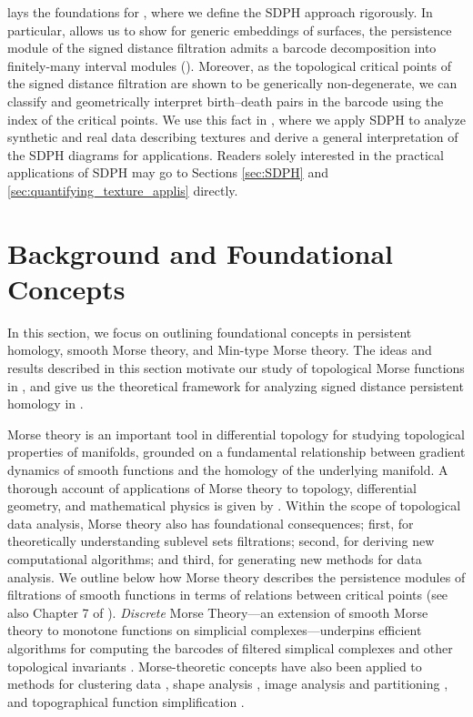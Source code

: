 \documentclass[11pt]{article}
\theoremstyle{plain}
\theoremstyle{definition}
\theoremstyle{remark}
\begin{document}
 lays the foundations for , where we define the SDPH approach rigorously. In particular,  allows us to show for generic embeddings of surfaces, the persistence module of the signed distance filtration admits a barcode decomposition into finitely-many interval modules (). Moreover, as the topological critical points of the signed distance filtration are shown to be generically non-degenerate, we can classify and geometrically interpret birth--death pairs in the barcode using the index of the critical points. We use this fact in , where we apply SDPH to analyze synthetic and real data describing textures and derive a general interpretation of the SDPH diagrams for applications.
Readers solely interested in the practical applications of SDPH may go to Sections \ref{sec:SDPH} and \ref{sec:quantifying_texture_applis} directly.


\section{Background and Foundational Concepts}
\label{sec:background}

In this section, we focus on outlining foundational concepts in persistent homology, smooth Morse theory, and Min-type Morse theory. The ideas and results described in this section motivate our study of topological Morse functions in , and give us the theoretical framework for analyzing signed distance persistent homology in . 

Morse theory \citep{milnor_morse_1963} is an important tool in differential topology for studying topological properties of manifolds, grounded on a fundamental relationship between  gradient dynamics of smooth functions and the homology of the underlying manifold. 
A thorough account of applications of Morse theory to topology, differential geometry, and mathematical physics is given by \cite{bott1988morse}. Within the scope of topological data analysis, Morse theory also has foundational consequences; first, for theoretically understanding sublevel sets filtrations; second, for deriving new computational algorithms; and third, for generating new methods for data analysis. We outline below how Morse theory describes the persistence modules of filtrations of smooth functions in terms of relations between critical points (see also Chapter 7 of \cite{ghrist2014elementary}). \emph{Discrete} Morse Theory---an extension of smooth Morse theory to monotone functions on simplicial complexes---underpins efficient algorithms for computing the barcodes of filtered simplical complexes \citep{harker2014discrete} and other topological invariants \citep{curry2016discrete}. Morse-theoretic concepts have also been applied to methods for clustering data \citep{chazal2013persistence}, shape analysis \citep{cazals2003molecular}, image analysis and partitioning \citep{edelsbrunner2001hierarchical}, and topographical function simplification \citep{bauer2012optimal,tierny2012generalized}.
\end{document}
